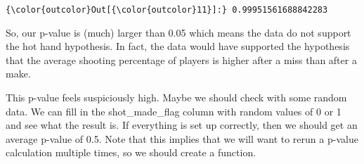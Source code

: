 \documentclass{article}
\begin{document}
            \begin{Verbatim}[commandchars=\\\{\}]
{\color{outcolor}Out[{\color{outcolor}11}]:} 0.99951561688842283
\end{Verbatim}
        
    So, our p-value is (much) larger than 0.05 which means the data do not
support the hot hand hypothesis. In fact, the data would have supported
the hypothesis that the average shooting percentage of players is higher
after a miss than after a make.

This p-value feels suspiciously high. Maybe we should check with some
random data. We can fill in the shot\_made\_flag column with random
values of 0 or 1 and see what the result is. If everything is set up
correctly, then we should get an average p-value of 0.5. Note that this
implies that we will want to rerun a p-value calculation multiple times,
so we should create a function.
\end{document}
